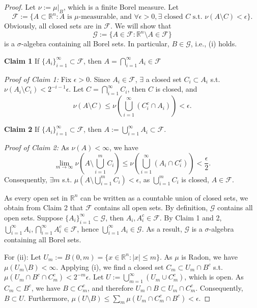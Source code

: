     \begin{proof}
        Let $\nu:=\mu|_{B}$, which is a finite Borel measure. Let 
        \[
            \mathscr{F}:=\{ A\subset \mathbb{R}^{n}:A\text{ is }\mu \text{-measurable, and }\forall \epsilon>0, \exists \text{ closed } C \text{ s.t. }\nu(A\setminus C)<\epsilon \}.
        \]
        Obviously, all closed sets are in $\mathscr{F}$. We will show that 
        \[
            \mathscr{G}:=\{ A\in \mathscr{F}:\mathbb{R}^{n}\setminus A \in \mathscr{F} \}
        \]
        is a $\sigma$-algebra containing all Borel sets. In particular, $B\in \mathscr{G}$, i.e., (i) holds.

        \textbf{Claim 1} If $\{ A_{i} \}_{i=1}^{\infty}\subset \mathcal{F}$, then $A=\bigcap _{i=1}^{\infty}A_{i}\in \mathscr{F}$

        \textit{Proof of Claim 1:} Fix $\epsilon >0$. Since $A_{i}\in \mathscr{F}$, $\exists$ a closed set $C_{i}\subset A_{i}$ s.t. $\nu(A_{i}\setminus C_{i})<2^{-i-1}\epsilon$. Let $C=\bigcap _{i=1}^{\infty}C_{i}$, then $C$ is closed, and 
        \[
            \nu(A\setminus C)\leq \nu\left( \bigcup _{i=1}^{\infty}(C_{i}^{c}\cap A_{i}) \right) <\epsilon.
        \]

        \textbf{Claim 2} If $\{ A_{i} \}_{i=1}^{\infty}\subset \mathscr{F}$, then $A:= \bigcup _{i=1}^{\infty}A_{i}\subset \mathscr{F}$.

        \textit{Proof of Claim 2:} As $\nu(A)<\infty$, we have 
        \[
            \lim_{ m \to \infty } \nu\left( A\setminus\bigcup _{i=1}^{m}C_{i} \right)\leq \nu\left( \bigcup _{i=1}^{\infty}(A_{i}\cap C_{i}^{c}) \right) < \frac{\epsilon}{2}.
        \]
        Consequently, $\exists m$ s.t. $\mu\left( A\setminus \bigcup _{i=1}^{m}C_{i} \right)<\epsilon$, as $\bigcup _{i=1}^{m}C_{i}$ is closed, $A \in \mathscr{F}$.

        As every open set in $\mathbb{R}^{n}$ can be written as a countable union of closed sets, we obtain from Claim 2 that $\mathscr{F}$ contains all open sets. By definition, $\mathscr{G}$ contains all open sets. Suppose $\{ A_{i} \}_{i=1}^{\infty}\subset \mathscr{G}$, then $A_{i},A_{i}^{c}\in \mathscr{F}$. By Claim 1 and 2, $\bigcup _{i=1}^{\infty} A_{i}, \bigcap _{i=1}^{\infty}A_{i}^{c} \in \mathscr{F}$, hence $\bigcup _{i=1}^{\infty}A_{i}\in \mathscr{G}$. As a result, $\mathscr{G}$ is a $\sigma$-algebra containing all Borel sets.

        For (ii): Let $U_{m}:= B(0,m)= \{ x \in \mathbb{R}^{n}:|x|\leq m \}$. As $\mu$ is Radon, we have $\mu(U_{m}\setminus B)<\infty$. Applying (i), we find a closed set $C_{m}\subset U_{m}\cap B^{c}$ s.t. $\mu(U_{m}\cap B^{c}\cap C_{m}^{c})<2^{-m}\epsilon$. Let $U:= \bigcup _{m=1}^{\infty}(U_{m}\cup C_{m}^{c})$, which is open. As $C_{m}\subset B^{c}$, we have $B\subset C_{m}^{c}$, and therefore $U_{m}\cap B\subset U_{m}\cap C_{m}^{c}$. Consequently, $B\subset U$. Furthermore, $\mu(U\setminus B)\leq \sum _{m}\mu(U_{m}\cap C_{m}^{c}\cap B^{c})<\epsilon$.
    \end{proof}

